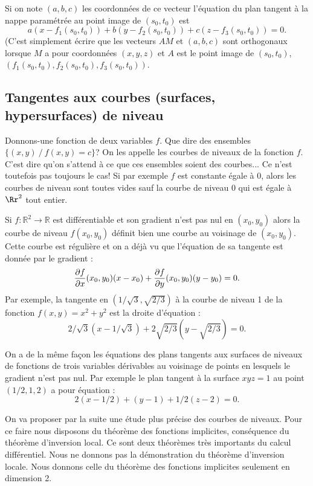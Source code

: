 \documentclass[class=report,crop=false]{standalone}
\begin{document}
{{{{{{$$$$
Si on note $(a,b,c)$ les coordonnées de ce vecteur l'équation du plan tangent \`a la nappe paramétrée au point image de $(s_0,t_0)$ est
$$
a(x-f_1(s_0,t_0))+b(y-f_2(s_0,t_0))+c(z-f_3(s_0,t_0))=0.
$$ 
(C'est simplement écrire que les vecteurs $AM$ et $(a,b,c)$ sont orthogonaux lorsque $M$ a pour coordonnées $(x,y,z)$ et $A$ est le point  image de $(s_0,t_0)$, $(f_1(s_0,t_0),f_ 2(s_0,t_0),f_3(s_0,t_0))$. 

\subsection{Tangentes aux courbes (surfaces, hypersurfaces) de niveau}

Donnons-une fonction de deux variables $f$. Que dire des ensembles $\{(x,y)\ /\ f(x,y)=c\}$? On les appelle les courbes de niveaux de la fonction $f$. C'est dire qu'on s'attend \`a ce que ces ensembles soient des courbes...
Ce n'est toutefois pas toujours le cas! Si par exemple $f$ est constante égale \`a $0$, alors les courbes de niveau sont toutes vides sauf la courbe de niveau $0$ qui est égale \`a $\Rr^2$ tout entier. 



Si $f: \mathbb R^2\to \mathbb R$ est différentiable et son gradient n'est pas nul en $(x_0,y_0)$ alors la courbe de niveau $f(x_0,y_0)$ définit bien une courbe au voisinage de $(x_0,y_0)$. Cette courbe est réguli\`ere et on a déj\`a vu que l'équation de sa tangente est donnée par le gradient :
$$
{{\partial f}\over{\partial x}}(x_0,y_0)(x-x_0)+{{\partial f}\over{\partial y}}(x_0,y_0)(y-y_0)=0.
$$
Par exemple, la tangente en $(1/\sqrt{3},\sqrt{2/3})$ \`a la courbe de niveau 1 de la fonction $f(x,y)=x^2+y^2$ est la droite d'équation :
$$
2/\sqrt{3}(x-1/\sqrt{3})+2\sqrt{2/3}(y-\sqrt{2/3})=0.
$$

On a de la m\^eme fa\c con les équations des plans tangents aux surfaces de niveaux de fonctions de trois variables dérivables au voisinage de points en lesquels le gradient n'est pas nul.
Par exemple le plan tangent \`a la surface $xyz=1$ au point $(1/2,1,2)$ a pour équation :
$$
2(x-1/2)+(y-1)+1/2(z-2)=0.
$$


On va proposer par la suite une étude plus précise des courbes de niveaux. Pour ce faire nous disposons du théor\`eme des fonctions implicites, conséquence du théor\`eme d'inversion local. Ce sont deux théor\`emes tr\`es importants du calcul différentiel. Nous ne donnons pas la démonstration du théor\`eme d'inversion locale. Nous donnons celle du théor\`eme des fonctions implicites seulement en dimension 2.
}}}}}}
\end{document}
